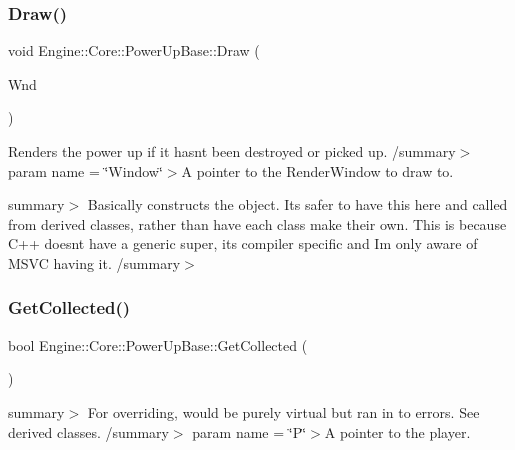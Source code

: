 \subsubsection{\texorpdfstring{Draw()}{Draw()}}
{\footnotesize\ttfamily void Engine\+::\+Core\+::\+Power\+Up\+Base\+::\+Draw (\begin{DoxyParamCaption}\item[{Render\+Window $\ast$}]{Wnd }\end{DoxyParamCaption})}



Renders the power up if it hasn\textquotesingle{}t been destroyed or picked up. /summary$>$ param name = \char`\"{}\+Window\char`\"{}$>$A pointer to the Render\+Window to draw to.

summary$>$ Basically constructs the object. It\textquotesingle{}s safer to have this here and called from derived classes, rather than have each class make their own. This is because C++ doesn\textquotesingle{}t have a generic super, it\textquotesingle{}s compiler specific and I\textquotesingle{}m only aware of M\+S\+VC having it. /summary$>$ \mbox{\label{class_engine_1_1_core_1_1_power_up_base_a3a2b9ec8b5c8151afd2790bd54ce323e}} 
\subsubsection{\texorpdfstring{Get\+Collected()}{GetCollected()}}
{\footnotesize\ttfamily bool Engine\+::\+Core\+::\+Power\+Up\+Base\+::\+Get\+Collected (\begin{DoxyParamCaption}\item[{void}]{ }\end{DoxyParamCaption})}

summary$>$ For overriding, would be purely virtual but ran in to errors. See derived classes. /summary$>$ param name = \char`\"{}\+P\char`\"{}$>$A pointer to the player.\mbox{\label{class_engine_1_1_core_1_1_power_up_base_a2b54cfc2afda10849a05f3095539c682}} 
